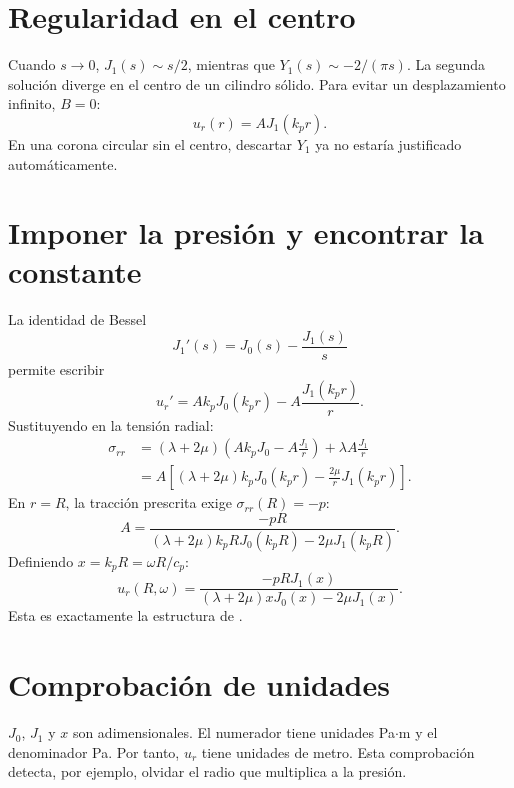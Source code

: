 \documentclass[11pt,a4paper]{report}
\numberwithin{equation}{chapter}
\DeclareRobustCommand{\code}[1]{\texttt{\detokenize{#1}}}
\begin{document}
\section{Regularidad en el centro}
Cuando $s\to0$, $J_1(s)\sim s/2$, mientras que
$Y_1(s)\sim-2/(\pi s)$. La segunda soluci\'on diverge en el centro
de un cilindro s\'olido. Para evitar un desplazamiento infinito,
$B=0$:
\begin{equation}
  u_r(r)=A J_1(k_pr).
  \label{eq:ur-A}
\end{equation}
En una corona circular sin el centro, descartar $Y_1$ ya no estar\'ia
justificado autom\'aticamente.

\section{Imponer la presi\'on y encontrar la constante}
La identidad de Bessel
\begin{equation}
 J_1'(s)=J_0(s)-\frac{J_1(s)}s
\end{equation}
permite escribir
\begin{equation}
 u_r'=A k_pJ_0(k_pr)-A\frac{J_1(k_pr)}r.
\end{equation}
Sustituyendo en la tensi\'on radial:
\begin{align}
 \sigma_{rr}
  &=(\lambda+2\mu)\left(Ak_pJ_0-A\frac{J_1}r\right)
     +\lambda A\frac{J_1}r\\
  &=A\left[(\lambda+2\mu)k_pJ_0(k_pr)
               -\frac{2\mu}{r}J_1(k_pr)\right].
\end{align}
En $r=R$, la tracci\'on prescrita exige $\sigma_{rr}(R)=-p$:
\begin{equation}
 A=\frac{-pR}
 {(\lambda+2\mu)k_pR J_0(k_pR)-2\mu J_1(k_pR)}.
\end{equation}
Definiendo $x=k_pR=\omega R/c_p$:
\begin{equation}
 \boxed{
 u_r(R,\omega)=
 \frac{-pR J_1(x)}
 {(\lambda+2\mu)xJ_0(x)-2\mu J_1(x)}.}
 \label{eq:ur-exacta}
\end{equation}
Esta es exactamente la estructura de \code{u_r_analitico}.

\section{Comprobaci\'on de unidades}
$J_0$, $J_1$ y $x$ son adimensionales. El numerador tiene unidades
Pa$\cdot$m y el denominador Pa. Por tanto,
$u_r$ tiene unidades de metro. Esta comprobaci\'on detecta, por ejemplo,
olvidar el radio que multiplica a la presi\'on.
\end{document}
